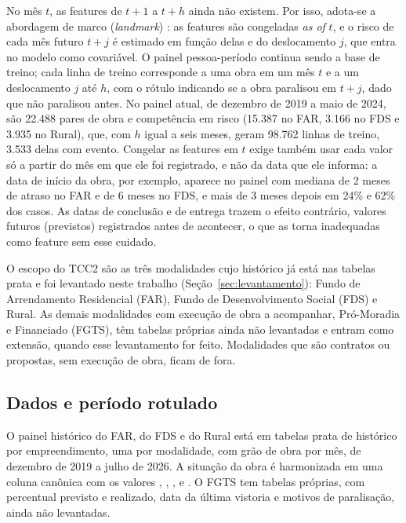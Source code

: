 No mês $t$, as features de $t+1$ a $t+h$ ainda não existem. Por isso, adota-se a abordagem de marco (\textit{landmark}) \cite{vanhouwelingen2007}: as features são congeladas \textit{as of} $t$, e o risco de cada mês futuro $t+j$ é estimado em função delas e do deslocamento $j$, que entra no modelo como covariável. O painel pessoa-período continua sendo a base de treino; cada linha de treino corresponde a uma obra em um mês $t$ e a um deslocamento $j$ até $h$, com o rótulo indicando se a obra paralisou em $t+j$, dado que não paralisou antes. No painel atual, de dezembro de 2019 a maio de 2024, são 22.488 pares de obra e competência em risco (15.387 no FAR, 3.166 no FDS e 3.935 no Rural), que, com $h$ igual a seis meses, geram 98.762 linhas de treino, 3.533 delas com evento. Congelar as features em $t$ exige também usar cada valor só a partir do mês em que ele foi registrado, e não da data que ele informa: a data de início da obra, por exemplo, aparece no painel com mediana de 2 meses de atraso no FAR e de 6 meses no FDS, e mais de 3 meses depois em 24\% e 62\% dos casos. As datas de conclusão e de entrega trazem o efeito contrário, valores futuros (previstos) registrados antes de acontecer, o que as torna inadequadas como feature sem esse cuidado.

O escopo do TCC2 são as três modalidades cujo histórico já está nas tabelas prata e foi levantado neste trabalho (Seção~\ref{sec:levantamento}): Fundo de Arrendamento Residencial (FAR), Fundo de Desenvolvimento Social (FDS) e Rural. As demais modalidades com execução de obra a acompanhar, Pró-Moradia e Financiado (FGTS), têm tabelas próprias ainda não levantadas e entram como extensão, quando esse levantamento for feito. Modalidades que são contratos ou propostas, sem execução de obra, ficam de fora.

\subsection{Dados e período rotulado}

O painel histórico do FAR, do FDS e do Rural está em tabelas prata de histórico por empreendimento, uma por modalidade, com grão de obra por mês, de dezembro de 2019 a julho de 2026. A situação da obra é harmonizada em uma coluna canônica com os valores , , ,  e . O FGTS tem tabelas próprias, com percentual previsto e realizado, data da última vistoria e motivos de paralisação, ainda não levantadas.

